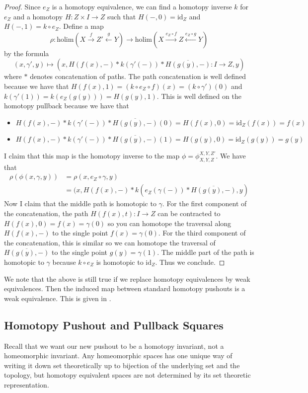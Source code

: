 \documentclass[a4paper]{article}
\begin{document}
\begin{prp}{}{}
\begin{proof}
Since $e_Z$ is a homotopy equivalence, we can find a homotopy inverse $k$ for $e_Z$ and a homotopy $H:Z\times I\to Z$ such that $H(-,0)=\text{id}_Z$ and $H(-,1)=k\circ e_Z$. Define a map $$\rho:\text{holim}(X\overset{f}{\rightarrow}Z'\overset{g}{\leftarrow}Y)\to\text{holim}(X\overset{e_Z\circ f}{\rightarrow}Z\overset{e_Z\circ g}{\leftarrow}Y)$$ by the formula $$(x,\gamma',y)\mapsto(x,H(f(x),-)\ast k(\gamma'(-))\ast\overline{H(g(y),-)}:I\to Z,y)$$ where $\ast$ denotes concatenation of paths. The path concatenation is well defined because we have that $H(f(x),1)=(k\circ e_Z\circ f)(x)=(k\circ\gamma')(0)$ and $k(\gamma'(1))=k(e_Z(g(y)))=H(g(y),1)$. This is well defined on the homotopy pullback because we have that 
\begin{itemize}
\item $H(f(x),-)\ast k(\gamma'(-))\ast\overline{H(g(y),-)}(0)=H(f(x),0)=\text{id}_Z(f(x))=f(x)$
\item $H(f(x),-)\ast k(\gamma'(-))\ast\overline{H(g(y),-)}(1)=H(g(y),0)=\text{id}_Z(g(y))=g(y)$
\end{itemize}
I claim that this map is the homotopy inverse to the map $\phi=\phi_{X,Y,Z}^{X,Y,Z'}$. We have that 
\begin{align*}
\rho(\phi(x,\gamma,y))&=\rho(x,e_Z\circ\gamma,y)\\
&=(x,H(f(x),-)\ast k(e_Z(\gamma(-))\ast\overline{H(g(y),-)},y)
\end{align*}
Now I claim that the middle path is homotopic to $\gamma$. For the first component of the concatenation, the path $H(f(x),t):I\to Z$ can be contracted to $H(f(x),0)=f(x)=\gamma(0)$ so you can homotope the traversal along $H(f(x),-)$ to the single point $f(x)=\gamma(0)$. For the third component of the concatenation, this is similar so we can homotope the traversal of $\overline{H(g(y),-)}$ to the single point $g(y)=\gamma(1)$. The middle part of the path is homotopic to $\gamma$ because $k\circ e_Z$ is homotopic to $\text{id}_Z$. Thus we conclude. 
\end{proof}
\end{prp}

We note that the above is still true if we replace homotopy equivalences by weak equivalences. Then the induced map between standard homotopy pushouts is a weak equivalence. This is given in \cite{CHT}. 

\subsection{Homotopy Pushout and Pullback Squares}
Recall that we want our new pushout to be a homotopy invariant, not a homeomorphic invariant. Any homeomorphic spaces has one unique way of writing it down set theoretically up to bijection of the underlying set and the topology, but homotopy equivalent spaces are not determined by its set theoretic representation. 
\end{document}
